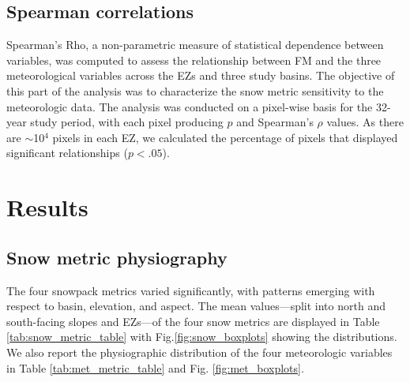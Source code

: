 \hypertarget{ch2-methods-3}{\subsection{Spearman correlations}\label{ch2-methods-3}}

Spearman's Rho, a non-parametric measure of statistical dependence between variables, was computed to assess the relationship between FM and the three meteorological variables across the EZs and three study basins. The objective of this part of the analysis was to characterize the snow metric sensitivity to the meteorologic data. The analysis was conducted on a pixel-wise basis for the 32-year study period, with each pixel producing $p$ and Spearman's $\rho$ values. As there are $\sim$10$^4$ pixels in each EZ, we calculated the percentage of pixels that displayed significant relationships ($p < .05$).

\hypertarget{ch2-results}{\section{Results}\label{ch2-results}}
\hypertarget{ch2-results-1}{\subsection{Snow metric physiography}\label{ch2-results-1}}

The four snowpack metrics varied significantly, with patterns emerging with respect to basin, elevation, and aspect. The mean values---split into north and south-facing slopes and EZs---of the four snow metrics are displayed in Table \ref{tab:snow_metric_table} with Fig.\ref{fig:snow_boxplots} showing the distributions. We also report the physiographic distribution of the four meteorologic variables in Table \ref{tab:met_metric_table} and Fig. \ref{fig:met_boxplots}.


